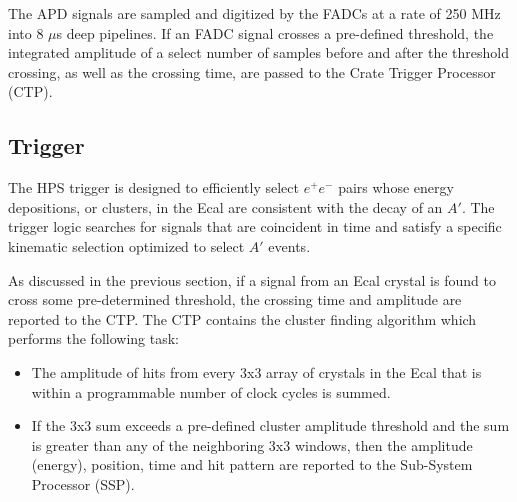 The APD signals are sampled and digitized by the FADCs at a rate of 250 MHz
into 8 $\mu$s deep pipelines.  If an FADC signal crosses a pre-defined
threshold, the integrated amplitude of a select number of samples before and
after the threshold crossing, as well as the crossing time, are passed to the
Crate Trigger Processor (CTP).

\subsection{Trigger}

The HPS trigger is designed to efficiently select $e^+e^-$ pairs whose energy
depositions, or clusters, in the Ecal are consistent with 
the decay of an $A'$. The trigger logic searches for signals that
are coincident in time and satisfy a specific kinematic selection optimized
to select $A'$ events.

As discussed in the previous section, if a signal from an Ecal crystal is found
to cross some pre-determined threshold, the crossing time and amplitude are 
reported to the CTP. The CTP contains the cluster finding algorithm
which performs the following task: 
\begin{itemize}
    \item The amplitude of hits from every 3x3 array of crystals in the Ecal that
          is within a programmable number of clock cycles is summed. 
    \item If the 3x3 sum exceeds a pre-defined cluster amplitude threshold and
          the sum is greater than any of the neighboring 3x3 windows, then the 
          amplitude (energy), position, time and hit pattern are reported to the Sub-System
          Processor (SSP).
\end{itemize}

